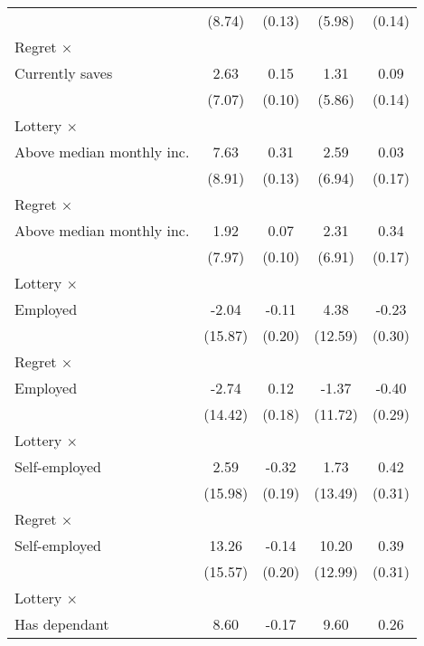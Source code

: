 \begin{table}[htbp]
\begin{tabular}{l*{4}{c}}
                &   (8.74)         &   (0.13)         &   (5.98)         &   (0.14)         \\
\addlinespace
Regret $\times$ \\ Currently saves&     2.63         &     0.15         &     1.31         &     0.09         \\
                &   (7.07)         &   (0.10)         &   (5.86)         &   (0.14)         \\
\addlinespace
Lottery $\times$ \\ Above median monthly inc.&     7.63         &     0.31\sym{**} &     2.59         &     0.03         \\
                &   (8.91)         &   (0.13)         &   (6.94)         &   (0.17)         \\
\addlinespace
Regret $\times$ \\ Above median monthly inc.&     1.92         &     0.07         &     2.31         &     0.34\sym{**} \\
                &   (7.97)         &   (0.10)         &   (6.91)         &   (0.17)         \\
\addlinespace
Lottery $\times$ \\ Employed&    -2.04         &    -0.11         &     4.38         &    -0.23         \\
                &  (15.87)         &   (0.20)         &  (12.59)         &   (0.30)         \\
\addlinespace
Regret $\times$ \\ Employed&    -2.74         &     0.12         &    -1.37         &    -0.40         \\
                &  (14.42)         &   (0.18)         &  (11.72)         &   (0.29)         \\
\addlinespace
Lottery $\times$ \\ Self-employed&     2.59         &    -0.32\sym{*}  &     1.73         &     0.42         \\
                &  (15.98)         &   (0.19)         &  (13.49)         &   (0.31)         \\
\addlinespace
Regret $\times$ \\ Self-employed&    13.26         &    -0.14         &    10.20         &     0.39         \\
                &  (15.57)         &   (0.20)         &  (12.99)         &   (0.31)         \\
\addlinespace
Lottery $\times$ \\ Has dependant&     8.60         &    -0.17         &     9.60         &     0.26         \\

\end{tabular}
\end{table}
